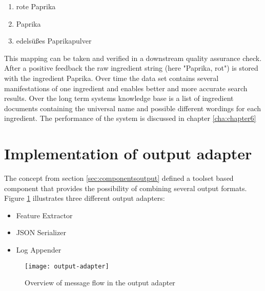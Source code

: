 \begin{enumerate}
\item rote Paprika
\item Paprika
\item edelsüßes Paprikapulver
\end{enumerate}
This mapping can be taken and verified in a downstream quality assurance check. After a positive feedback the raw ingredient string (here "Paprika, rot") is stored with the ingredient Paprika. Over time the data set contains several manifestations of one ingredient and enables better and more accurate search results. Over the long term systems knowledge base is a list of ingredient documents containing the universal name and possible different wordings for each ingredient. The performance of the system is discussed in chapter \ref{cha:chapter6}

\section{Implementation of output adapter}

The concept from section \ref{sec:componentsoutput} defined a toolset based component that provides the possibility of combining several output formats. Figure \ref{fig:output-adapter} illustrates three different output adapters:
\begin{itemize}
\item Feature Extractor
\item JSON Serializer
\item Log Appender
\end{itemize}

\begin{figure}[htb]
  \centering
  \texttt{[image: output-adapter]}\\
  \caption{Overview of message flow in the output adapter}
  \label{fig:output-adapter}
\end{figure}


